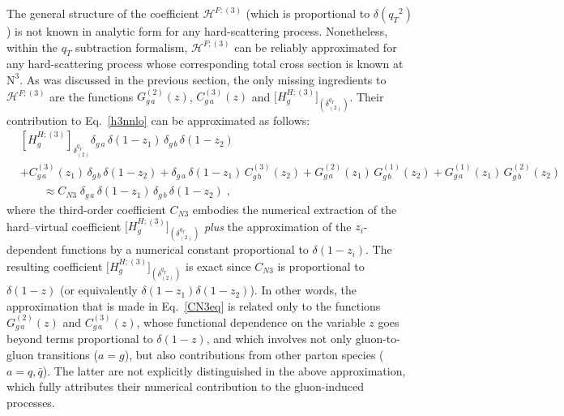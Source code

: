 \documentclass[12pt]{article}
\DeclareRobustCommand{\nn}{\nonumber}
\DeclareRobustCommand{\qt}{\ensuremath{q_T}\xspace}
\DeclareRobustCommand{\cH}{\ensuremath{\mathcal{H}}}
\DeclareRobustCommand{\LO}{\text{LO}\xspace}
\DeclareRobustCommand{\N}[1]{\ensuremath{\text{N}^{#1}}} %
\begin{document}
The general structure of the coefficient $\cH^{F;(3)}$ (which is proportional to $\delta(\qt^{2})$) is not known in analytic form for any hard-scattering process. Nonetheless, within the $\qt$ subtraction  formalism, $\cH^{F;(3)}$ can be reliably approximated for any hard-scattering process whose corresponding total cross section is known at \N3\LO. 
As was discussed in the previous section, the only missing ingredients to $\cH^{F;(3)}$ are the functions $G^{(2)}_{g\,a}(z)$, $C^{(3)}_{g\,a}(z)$ and $ \big[H^{H;(3)}_{g}\big]_{(\delta^{\qt}_{(2)})}$. 
Their contribution to Eq.~\eqref{h3nnlo} can be approximated as follows:
\begin{align}
  &
  \left[ H_g^{H;(3)} \right]_{\delta^{\qt}_{(2)}} 
  \delta_{g\,a} \, \delta(1-z_1) \, \delta_{g\,b} \, \delta(1-z_2) 
  \nn\\&
  + C^{(3)}_{g\,a}(z_1) \, \delta_{g\,b} \, \delta(1-z_2) 
  + \delta_{g\,a} \, \delta(1-z_1) \, C^{(3)}_{g\,b}(z_2) 
  + G^{(2)}_{g\,a}(z_1) \, G^{(1)}_{g\,b}(z_2) 
  + G^{(1)}_{g\,a}(z_1) \, G^{(2)}_{g\,b}(z_2) 
  \nn\\&\qquad\approx
  C_{N3} \; \delta_{g\,a} \, \delta(1-z_1) \, \delta_{g\,b} \, \delta(1-z_2) \;,
  \label{CN3eq}
\end{align}
where the third-order coefficient $C_{N3}$ embodies the numerical extraction of the hard--virtual coefficient $\big[H^{H;(3)}_{g}\big]_{(\delta^{\qt}_{(2)})}$  \textit{plus} the approximation of the $z_i$-dependent functions by a numerical constant proportional to $\delta(1-z_i)$. The resulting coefficient $\big[H^{H;(3)}_{g}\big]_{(\delta^{\qt}_{(2)})}$ is exact since $C_{N3}$ is proportional to $\delta(1-z)$ (or equivalently $\delta(1-z_1)\delta(1-z_2)$). In other words, the approximation that is made in Eq.~\eqref{CN3eq} is related only to the functions  $G^{(2)}_{g\,a}(z)$ and $C^{(3)}_{g\,a}(z)$, whose functional dependence on the variable $z$ goes beyond terms proportional to $\delta(1-z)$, and which involves not only gluon-to-gluon transitions ($a=g$), but also contributions from 
other parton species ($a=q,\bar q$). The latter are not explicitly distinguished in the above approximation, which fully attributes their numerical contribution to the gluon-induced processes. 
\end{document}
